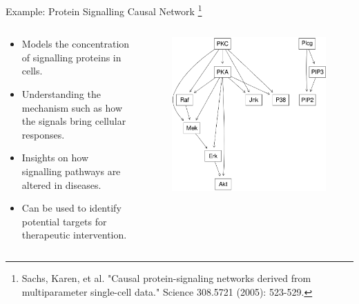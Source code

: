 \documentclass[aspectratio=169]{beamer}
\begin{document}
\begin{frame}{Example: Protein Signalling Causal Network \footnote{Sachs, Karen, et al. "Causal protein-signaling networks derived from multiparameter single-cell data." Science 308.5721 (2005): 523-529.}}
	\begin{columns}
		\begin{column}{0.5\textwidth}
			\begin{itemize}
				\item Models the concentration of signalling proteins in cells.
				\item Understanding the mechanism such as how the signals bring cellular responses.
				\item Insights on how signalling pathways are altered in diseases.
				\item Can be used to identify potential targets for therapeutic intervention.
			\end{itemize}
		\end{column}
		\begin{column}{0.5\textwidth}
			\begin{figure}
				\centering
				\includegraphics[scale=0.22]{imgs/sachs.png}
			\end{figure}
		\end{column}
	\end{columns}
\end{frame}
\end{document}
